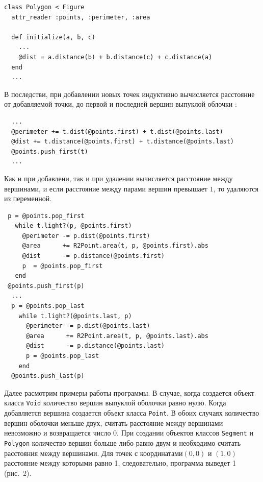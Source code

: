 \begin{small}
\begin{verbatim}
class Polygon < Figure
  attr_reader :points, :perimeter, :area

  def initialize(a, b, c)
    ...
    @dist = a.distance(b) + b.distance(c) + c.distance(a)
  end
  ...
\end{verbatim}
\end{small}

В последстви, при добавлении новых точек индуктивно вычисляется расстояние от добавляемой точки, до первой и последней вершин выпуклой облочки :

\begin{small}
\begin{verbatim}
  ...
  @perimeter += t.dist(@points.first) + t.dist(@points.last)
  @dist += t.distance(@points.first) + t.distance(@points.last)
  @points.push_first(t)
  ...
\end{verbatim}
\end{small}

Как и при добавлени, так и при удалении вычисляется расстояние между вершинами, и если расстояние между парами вершин превышает $1$, то удаляются из переменной.

\begin{small}
\begin{verbatim}
 p = @points.pop_first
   while t.light?(p, @points.first)
     @perimeter -= p.dist(@points.first)
     @area      += R2Point.area(t, p, @points.first).abs
     @dist      -= p.distance(@points.first)
     p  = @points.pop_first
   end
 @points.push_first(p)
  ...
  p = @points.pop_last
    while t.light?(@points.last, p)
      @perimeter -= p.dist(@points.last)
      @area      += R2Point.area(t, p, @points.last).abs
      @dist      -= p.distance(@points.last)
      p = @points.pop_last
    end
  @points.push_last(p)
\end{verbatim}
\end{small}

Далее расмотрим примеры работы программы. 
В случае, когда создается объект класса \texttt{Void} количество вершин выпуклой оболочки равно нулю. Когда добавляется вершина создается объект класса \texttt{Point}. В обоих случаях количество вершин оболочки меньше двух, считать расстояние между вершинами невозможно и возвращается число 0. При создании объектов классов \texttt{Segment} и \texttt{Polygon} количество вершин больше либо равно двум и необходимо считать расстояния между вершинами.
Для точек  с координатами$(0, 0)$ и $(1, 0)$ расстояние между которыми равно 1, следовательно, программа выведет 1 (рис.~2).

